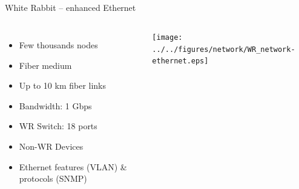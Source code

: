 \documentclass[compress,red]{beamer}
\begin{document}
\subsection{}
\begin{frame}{White Rabbit -- enhanced Ethernet}

\begin{columns}[c]
 

  \begin{itemize}
    \item Few thousands nodes
    \item Fiber medium
    \item Up to 10 km fiber links
    \item Bandwidth: 1 Gbps
    \item WR Switch: 18 ports
    \item Non-WR Devices
    \item Ethernet features (VLAN) \& protocols (SNMP)
  \end{itemize}

    \begin{center}
    \texttt{[image: ../../figures/network/WR\_network-ethernet.eps]}
    \end{center}
\end{columns}

\end{frame}
\end{document}
